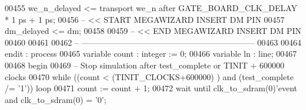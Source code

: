 \begin{DoxyCode}
00455     \textcolor{vhdlchar}{we_n_delayed}    \textcolor{vhdlchar}{<=}   \textcolor{keywordflow}{transport} \textcolor{vhdlchar}{we_n}   \textcolor{keywordflow}{after} \textcolor{vhdlchar}{GATE_BOARD_CLK_DELAY} \textcolor{vhdlchar}{*} \textcolor{vhdllogic}{}\textcolor{vhdllogic}{1} \textcolor{vhdlchar}{ps} \textcolor{vhdlchar}{+} \textcolor{vhdllogic}{}\textcolor{vhdllogic}{1} \textcolor{vhdlchar}{ps};
00456 \textcolor{keyword}{-- << START MEGAWIZARD INSERT DM PIN}
00457     \textcolor{vhdlchar}{dm_delayed}      \textcolor{vhdlchar}{<=}      \textcolor{vhdlchar}{dm};
00458  
00459 \textcolor{keyword}{-- << END MEGAWIZARD INSERT DM PIN}
00460 
00461 
00462 \textcolor{keyword}{-- ---------------------------------------------------------------}
00463 
00464     endit : \textcolor{keywordflow}{process}
00465     \textcolor{keywordflow}{variable} \textcolor{vhdlchar}{count}          \textcolor{vhdlchar}{:} \textcolor{comment}{integer} \textcolor{vhdlchar}{:=} \textcolor{vhdllogic}{}\textcolor{vhdllogic}{0};
00466     \textcolor{keywordflow}{variable} \textcolor{vhdlchar}{ln} \textcolor{vhdlchar}{:} \textcolor{vhdlchar}{line};
00467 
00468 \textcolor{vhdlkeyword}{    begin}
00469 \textcolor{keyword}{        -- Stop simulation after test\_complete or TINIT + 600000 clocks}
00470         \textcolor{keywordflow}{while} \textcolor{vhdlchar}{(}\textcolor{vhdlchar}{(}\textcolor{vhdlchar}{count} \textcolor{vhdlchar}{<} \textcolor{vhdlchar}{(}\textcolor{vhdlchar}{TINIT_CLOCKS}\textcolor{vhdlchar}{+}\textcolor{vhdllogic}{}\textcolor{vhdllogic}{600000}\textcolor{vhdlchar}{)} \textcolor{vhdlchar}{)} \textcolor{keywordflow}{and} \textcolor{vhdlchar}{(}\textcolor{vhdlchar}{test_complete} \textcolor{vhdlchar}{/=} \textcolor{vhdlchar}{'}\textcolor{vhdllogic}{}\textcolor{vhdllogic}{1}\textcolor{vhdlchar}{'}\textcolor{vhdlchar}{)}\textcolor{vhdlchar}{)} \textcolor{keywordflow}{loop}
00471             \textcolor{vhdlchar}{count} \textcolor{vhdlchar}{:=} \textcolor{vhdlchar}{count} \textcolor{vhdlchar}{+} \textcolor{vhdllogic}{}\textcolor{vhdllogic}{1};
00472             \textcolor{keywordflow}{wait} \textcolor{keywordflow}{until} \textcolor{vhdlchar}{clk_to_sdram}\textcolor{vhdlchar}{(}\textcolor{vhdllogic}{}\textcolor{vhdllogic}{0}\textcolor{vhdlchar}{)}\textcolor{vhdlchar}{'}\textcolor{vhdlkeyword}{event} \textcolor{keywordflow}{and} \textcolor{vhdlchar}{clk_to_sdram}\textcolor{vhdlchar}{(}\textcolor{vhdllogic}{}\textcolor{vhdllogic}{0}\textcolor{vhdlchar}{)} \textcolor{vhdlchar}{=} \textcolor{vhdlchar}{'}\textcolor{vhdllogic}{}\textcolor{vhdllogic}{0}\textcolor{vhdlchar}{'};

\end{DoxyCode}
